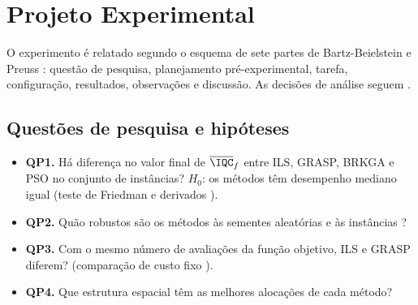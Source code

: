 %
%   
%   

\section{Projeto Experimental}
\label{sec:projeto}

O experimento é relatado segundo o esquema de sete partes de Bartz-Beielstein e Preuss
\cite{bartzbeielstein2010future}: questão de pesquisa, planejamento pré-experimental, tarefa,
configuração, resultados, observações e discussão. As decisões de análise seguem
\cite{derrac2011practical,eiben2011parameter,beiranvand2017best,chiarandini2010mixed}.

\subsection{Questões de pesquisa e hipóteses}

\begin{itemize}
\item \textbf{QP1.} Há diferença no valor final de $\overline{\IQC}_f$ entre ILS, GRASP, BRKGA e PSO
no conjunto de instâncias? $H_0$: os métodos têm desempenho mediano igual (teste de Friedman e
derivados \cite[Sec.~4.2]{derrac2011practical}).
\item \textbf{QP2.} Quão robustos são os métodos às sementes aleatórias e às instâncias
\cite[Sec.~4.2]{eiben2011parameter}?
\item \textbf{QP3.} Com o mesmo número de avaliações da função objetivo, ILS e GRASP diferem?
(comparação de custo fixo \cite[Sec.~4.3]{beiranvand2017best}).
\item \textbf{QP4.} Que estrutura espacial têm as melhores alocações de cada método?
\end{itemize}

